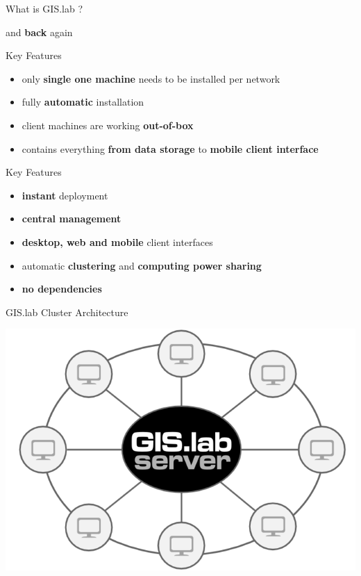 \documentclass[12pt]{beamer}
\begin{document}
\begin{frame}{What is GIS.lab ?}
	\begin{center}
		and \textbf{back} again
	\end{center}
\end{frame}

\begin{frame}{Key Features}
	\begin{itemize}
		\item only \textbf{single one machine} needs to be installed per network
		\item fully \textbf{automatic} installation
		\item client machines are working \textbf{out-of-box}
		\item contains everything \textbf{from data storage} to \textbf{mobile client interface}
	\end{itemize}
\end{frame}

\begin{frame}{Key Features}
	\begin{itemize}[<+->]
		\item \textbf{instant} deployment
		\item \textbf{central management}
		\item \textbf{desktop, web and mobile} client interfaces
		\item automatic \textbf{clustering} and \textbf{computing power sharing}
		\item \textbf{no dependencies}
	\end{itemize}
\end{frame}

\begin{frame}{GIS.lab Cluster Architecture}
	\begin{center}
		\includegraphics[keepaspectratio=true,height=0.8\textheight]{images/gislab-cluster-architecture.png}
	\end{center}
\end{frame}
\end{document}
